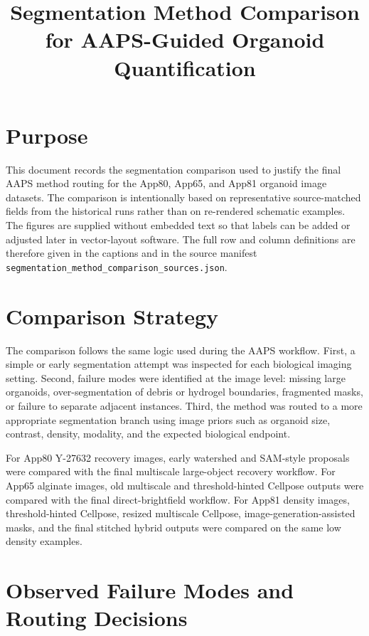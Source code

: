 \documentclass[11pt]{article}
\title{Segmentation Method Comparison for AAPS-Guided Organoid Quantification}
\author{}
\date{}
\begin{document}
\maketitle

\section*{Purpose}

This document records the segmentation comparison used to justify the final AAPS
method routing for the App80, App65, and App81 organoid image datasets. The
comparison is intentionally based on representative source-matched fields from
the historical runs rather than on re-rendered schematic examples. The figures
are supplied without embedded text so that labels can be added or adjusted later
in vector-layout software. The full row and column definitions are therefore
given in the captions and in the source manifest
\texttt{segmentation\_method\_comparison\_sources.json}.

\section*{Comparison Strategy}

The comparison follows the same logic used during the AAPS workflow. First, a
simple or early segmentation attempt was inspected for each biological imaging
setting. Second, failure modes were identified at the image level: missing large
organoids, over-segmentation of debris or hydrogel boundaries, fragmented masks,
or failure to separate adjacent instances. Third, the method was routed to a
more appropriate segmentation branch using image priors such as organoid size,
contrast, density, modality, and the expected biological endpoint.

For App80 Y-27632 recovery images, early watershed and SAM-style proposals were
compared with the final multiscale large-object recovery workflow. For App65
alginate images, old multiscale and threshold-hinted Cellpose outputs were
compared with the final direct-brightfield workflow. For App81 density images,
threshold-hinted Cellpose, resized multiscale Cellpose, image-generation-assisted
masks, and the final stitched hybrid outputs were compared on the same low
density examples.

\section*{Observed Failure Modes and Routing Decisions}
\end{document}
